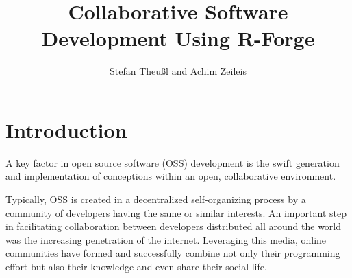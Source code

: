 \title{Collaborative Software Development Using R-Forge}
\author{Stefan Theu\ss{}l and Achim Zeileis}

\maketitle



\newcommand{\tab}[1]{{\normalfont\textit{#1}}}

\section*{Introduction}


A key factor in open source software (OSS) development is the swift
generation and implementation of conceptions within an open,
collaborative environment. 

Typically, OSS is created in a decentralized self-organizing process by a
community of developers having the same or similar interests. An
important step in facilitating collaboration between developers
distributed all around the world was the increasing penetration of the internet.
Leveraging this media, online communities have formed and successfully
combine not only their programming effort but also their knowledge and even
share their social life. 

